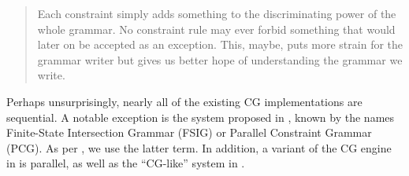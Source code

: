  \begin{quote}
 Each constraint simply adds something to the discriminating power of the
 whole grammar. No constraint rule may ever forbid something that would
 later on be accepted as an exception. This, maybe, puts more strain for
 the grammar writer but gives us better hope of understanding the grammar
 we write.
 \end{quote}

Perhaps unsurprisingly, nearly all of the existing CG implementations are sequential.
A notable exception is the system proposed in \cite{koskenniemi90}, known by the names Finite-State Intersection Grammar (FSIG) or Parallel Constraint Grammar (PCG). 
As per \cite{koskenniemi97}, we use the latter term. 
In addition, a variant of the CG engine in \cite{listenmaa_claessen2015} is parallel,
as well as the ``CG-like'' system in \cite{lager98}.




% 
% 
% 
% 
% 

  
